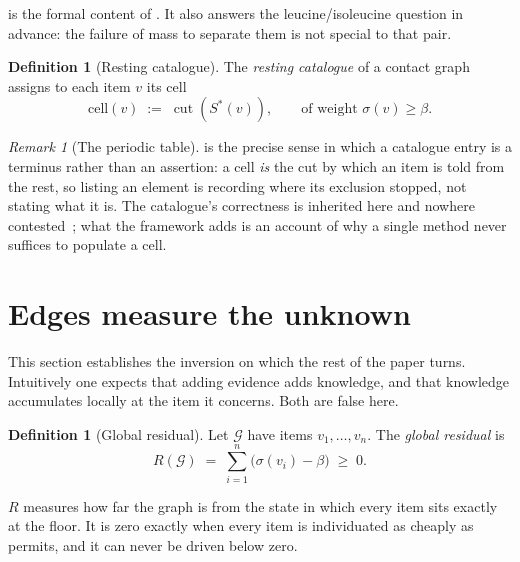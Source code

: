 \documentclass[11pt,a4paper]{article}
\theoremstyle{definition}
\newtheorem{definition}[theorem]{Definition}
\theoremstyle{remark}
\newtheorem{remark}[theorem]{Remark}
\newcommand{\Gph}{\mathcal{G}}              %
\newcommand{\flo}{\beta}                     %
\newcommand{\cut}{\operatorname{cut}}
\newcommand{\sep}{\sigma}                    %
\newcommand{\resid}{R}                       %
\newcommand{\Cat}{\mathrm{cell}}
\begin{document}
 is the formal content of . It also
answers the leucine/isoleucine question in advance: the failure of mass
to separate them is not special to that pair.

\begin{definition}[Resting catalogue]
\label{def:catalogue}
The \emph{resting catalogue} of a contact graph assigns to each item $v$
its cell
\[
  \Cat(v)\;:=\;\cut(S^{\ast}(v)),
  \qquad \text{of weight } \sep(v)\ge\flo .
\]
\end{definition}

\begin{remark}[The periodic table]
\label{rem:periodic}
 is the precise sense in which a catalogue entry is a
terminus rather than an assertion: a cell \emph{is} the cut by which an
item is told from the rest, so listing an element is recording where its
exclusion stopped, not stating what it is. The catalogue's correctness is
inherited here and nowhere
contested~\citep{mendeleev1869,scerri2007}; what the framework adds is an
account of why a single method never suffices to populate a cell.
\end{remark}

\section{Edges measure the unknown}
\label{sec:residual}

This section establishes the inversion on which the rest of the paper
turns. Intuitively one expects that adding evidence adds knowledge, and
that knowledge accumulates locally at the item it concerns. Both are
false here.

\begin{definition}[Global residual]
\label{def:residual}
Let $\Gph$ have items $v_1,\dots,v_n$. The \emph{global residual} is
\[
  \resid(\Gph)\;=\;\sum_{i=1}^{n}\bigl(\sep(v_i)-\flo\bigr)\;\ge\;0 .
\]
\end{definition}

$\resid$ measures how far the graph is from the state in which every item
sits exactly at the floor. It is zero exactly when every item is
individuated as cheaply as  permits, and it can never be
driven below zero.
\end{document}
